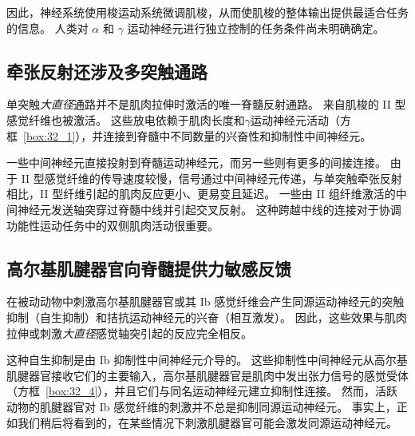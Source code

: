 因此，神经系统使用梭运动系统微调肌梭，从而使肌梭的整体输出提供最适合任务的信息。
人类对 $ \alpha $ 和 $ \gamma $ 运动神经元进行独立控制的任务条件尚未明确确定。



\subsection{牵张反射还涉及多突触通路}

单突触\textit{大直径}通路并不是肌肉拉伸时激活的唯一脊髓反射通路。
来自肌梭的 II 型感觉纤维也被激活。
这些放电依赖于肌肉长度和$ \gamma $运动神经元活动（方框~\ref{box:32_1}），并连接到脊髓中不同数量的兴奋性和抑制性中间神经元。


一些中间神经元直接投射到脊髓运动神经元，而另一些则有更多的间接连接。
由于 II 型感觉纤维的传导速度较慢，信号通过中间神经元传递，与单突触牵张反射相比，II 型纤维引起的肌肉反应更小、更易变且延迟。
一些由 II 组纤维激活的中间神经元发送轴突穿过脊髓中线并引起交叉反射。
这种跨越中线的连接对于协调功能性运动任务中的双侧肌肉活动很重要。



\subsection{高尔基肌腱器官向脊髓提供力敏感反馈}

在被动动物中刺激高尔基肌腱器官或其 Ib 感觉纤维会产生同源运动神经元的突触抑制（自生抑制）和拮抗运动神经元的兴奋（相互激发）。
因此，这些效果与肌肉拉伸或刺激\textit{大直径}感觉轴突引起的反应完全相反。


这种自生抑制是由 Ib 抑制性中间神经元介导的。
这些抑制性中间神经元从高尔基肌腱器官接收它们的主要输入，高尔基肌腱器官是肌肉中发出张力信号的感觉受体（方框~\ref{box:32_4}），并且它们与同名运动神经元建立抑制性连接。
然而，活跃动物的肌腱器官对 Ib 感觉纤维的刺激并不总是抑制同源运动神经元。
事实上，正如我们稍后将看到的，在某些情况下刺激肌腱器官可能会激发同源运动神经元。


